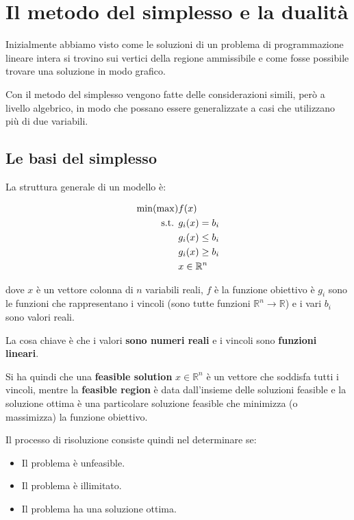
\chapter{Il metodo del simplesso e la dualità}

Inizialmente abbiamo visto come le soluzioni di un problema di programmazione lineare intera si trovino sui vertici della regione ammissibile e come fosse possibile trovare una soluzione in modo grafico.

Con il metodo del simplesso vengono fatte delle considerazioni simili, però a livello algebrico, in modo che possano essere generalizzate a casi che utilizzano più di due variabili.

\section{Le basi del simplesso}

La struttura generale di un modello è:

\begin{align*}
	\min(\max) &f(x) \\
		\text{s.t. } &g_i(x) = b_i \\
			&g_i(x) \leq b_i \\
			&g_i(x) \geq b_i \\
			&x \in \mathbb{R}^n
\end{align*}

\noindent dove $x$ è un vettore colonna di $n$ variabili reali, $f$ è la funzione obiettivo è $g_i$ sono le funzioni che rappresentano i vincoli (sono tutte funzioni $\mathbb{R}^n \to \mathbb{R}$) e i vari $b_i$ sono valori reali.

La cosa chiave è che i valori \textbf{sono numeri reali} e i vincoli sono \textbf{funzioni lineari}.

Si ha quindi che una \textbf{feasible solution} $x \in \mathbb{R}^n$ è un vettore che soddisfa tutti i vincoli, mentre la \textbf{feasible region} è data dall'insieme delle soluzioni feasible e la soluzione ottima è una particolare soluzione feasible che minimizza (o massimizza) la funzione obiettivo.

Il processo di risoluzione consiste quindi nel determinare se:

\begin{itemize}
	\item Il problema è unfeasible.
	\item Il problema è illimitato.
	\item Il problema ha una soluzione ottima.
\end{itemize}

